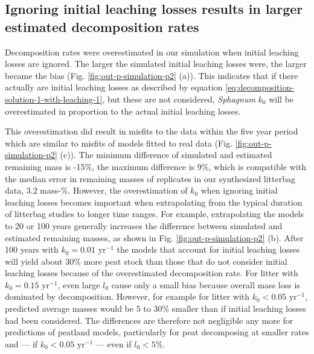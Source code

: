 \documentclass[bg, manuscript]{copernicus}
\begin{document}
\hypertarget{out-res-2}{%
\subsection{Ignoring initial leaching losses results in larger estimated decomposition rates}\label{out-res-2}}

Decomposition rates were overestimated in our simulation when initial leaching losses are ignored. The larger the simulated initial leaching losses were, the larger became the bias (Fig. \ref{fig:out-p-simulation-p2} (a)). This indicates that if there actually are initial leaching losses as described by equation \eqref{eq:decomposition-solution-1-with-leaching-1}, but these are not considered, \emph{Sphagnum} \(k_0\) will be overestimated in proportion to the actual initial leaching losses.

This overestimation did result in misfits to the data within the five year period which are similar to misfits of models fitted to real data (Fig. \ref{fig:out-p-simulation-p2} (c)). The minimum difference of simulated and estimated remaining mass is -15\%, the maximum difference is 9\%, which is compatible with the median error in remaining masses of replicates in our synthesized litterbag data, 3.2 mass-\%. However, the overestimation of \(k_0\) when ignoring initial leaching losses becomes important when extrapolating from the typical duration of litterbag studies to longer time ranges. For example, extrapolating the models to 20 or 100 years generally increases the difference between simulated and estimated remaining masses, as shown in Fig. \ref{fig:out-p-simulation-p2} (b). After 100 years with \(k_0 = 0.01\) yr\(^{-1}\) the models that account for initial leaching losses will yield about 30\% more peat stock than those that do not consider initial leaching losses because of the overestimated decomposition rate. For litter with \(k_0 = 0.15\) yr\(^{-1}\), even large \(l_0\) cause only a small bias because overall mass loss is dominated by decomposition. However, for example for litter with \(k_0<0.05\) yr\(^{-1}\), predicted average masses would be 5 to 30\% smaller than if initial leaching losses had been considered. The differences are therefore not negligible any more for predictions of peatland models, particularly for peat decomposing at smaller rates and --- if \(k_0<0.05\) yr\(^{-1}\) --- even if \(l_0<5\)\%.
\end{document}
